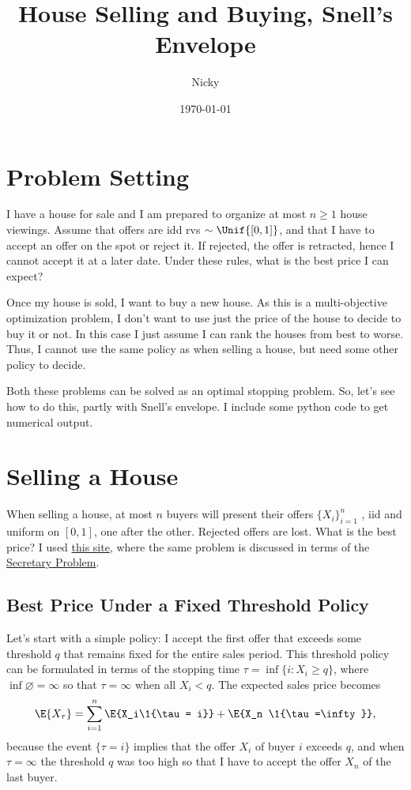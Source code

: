 \documentclass[a4paper]{article}
\author{Nicky}
\date{\today}
\title{House Selling and Buying, Snell's Envelope}
\begin{document}
\maketitle
\tableofcontents

\section{Problem Setting}
\label{sec:org2b21e52}

I have a house for sale and I am prepared to organize at most \(n\geq 1\) house viewings.
Assume that offers are idd rvs \(\sim \Unif{[0,1]}\), and that I have to accept an offer on the spot or reject it.
If rejected, the offer is retracted, hence I cannot accept it at a later date.
Under these rules, what is the best price I can expect?

Once my house is sold, I want to buy a new house.
As this is a multi-objective optimization problem, I don't want to use just the price of the house to decide to buy it or not.
In this case I just assume I can rank the houses from best to worse.  Thus, I cannot use the same policy as when selling a house, but need some other policy to decide.

Both these problems can be solved as an optimal stopping problem.
So, let's see how to do this, partly with Snell's envelope.
I include some python code to get numerical output.
\section{Selling a House}
\label{sec:org7deab1f}

When selling a house, at most \(n\) buyers will present their offers \(\{X_i\}_{i=1}^n\) , iid and uniform on \([0,1]\), one after the other.
Rejected offers are lost.
What is the best price?
I used \href{https://arminstraub.com/math/hiringsecretary}{this site}, where the same problem is discussed in terms of the \href{https://en.wikipedia.org/wiki/Secretary\_problem}{Secretary Problem}.
\subsection{Best Price Under a Fixed Threshold Policy}
\label{sec:org8449195}

Let's start with a simple policy: I accept the first offer that exceeds some threshold \(q\) that remains fixed for the entire sales period.
This threshold policy can be formulated in terms of the stopping time \(\tau = \inf\{i : X_i \geq q\}\), where \(\inf \varnothing = \infty\) so that \(\tau=\infty\) when all \(X_i < q\).
The expected sales price becomes
\label{snell-eq1}
\begin{equation}\label{snell-eq1}
\E{X_{\tau}} = \sum_{i=1}^n \E{X_i\1{\tau = i}} + \E{X_n \1{\tau=\infty}},
\end{equation}
because the event \(\{\tau = i \}\) implies that the offer \(X_i\) of buyer \(i\) exceeds \(q\), and when \(\tau=\infty\) the threshold \(q\) was too high so that I have to accept the offer \(X_n\) of the last buyer.
\end{document}
